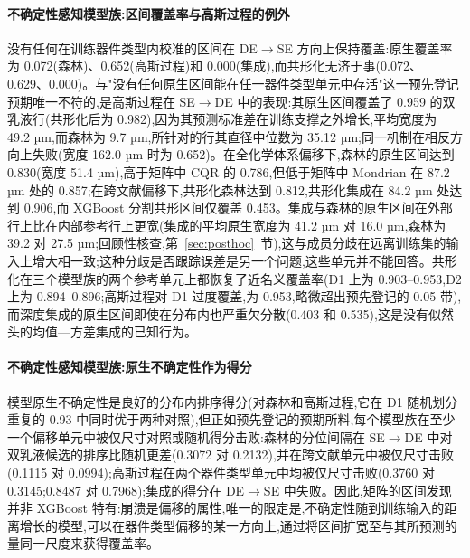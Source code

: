 \documentclass[11pt,a4paper]{ctexart}
\begin{document}
\paragraph{不确定性感知模型族:区间覆盖率与高斯过程的例外} 没有任何在训练器件类型内校准的区间在 DE$\to$SE 方向上保持覆盖:原生覆盖率为 0.072(森林)、0.652(高斯过程)和 0.000(集成),而共形化无济于事(0.072、0.629、0.000)。与"没有任何原生区间能在任一器件类型单元中存活"这一预先登记预期唯一不符的,是高斯过程在 SE$\to$DE 中的表现:其原生区间覆盖了 0.959 的双乳液行(共形化后为 0.982),因为其预测标准差在训练支撑之外增长,平均宽度为 49.2 µm,而森林为 9.7 µm,所针对的行其直径中位数为 35.12 µm;同一机制在相反方向上失败(宽度 162.0 µm 时为 0.652)。在全化学体系偏移下,森林的原生区间达到 0.830(宽度 51.4 µm),高于矩阵中 CQR 的 0.786,但低于矩阵中 Mondrian 在 87.2 µm 处的 0.857;在跨文献偏移下,共形化森林达到 0.812,共形化集成在 84.2 µm 处达到 0.906,而 XGBoost 分割共形区间仅覆盖 0.453。集成与森林的原生区间在外部行上比在内部参考行上更宽(集成的平均原生宽度为 41.2 µm 对 16.0 µm,森林为 39.2 对 27.5 µm;回顾性核查,第~\ref{sec:posthoc}~节),这与成员分歧在远离训练集的输入上增大相一致;这种分歧是否跟踪误差是另一个问题,这些单元并不能回答。共形化在三个模型族的两个参考单元上都恢复了近名义覆盖率(D1 上为 0.903–0.953,D2 上为 0.894–0.896;高斯过程对 D1 过度覆盖,为 0.953,略微超出预先登记的 0.05 带),而深度集成的原生区间即使在分布内也严重欠分散(0.403 和 0.535),这是没有似然头的均值—方差集成的已知行为。

\paragraph{不确定性感知模型族:原生不确定性作为得分} 模型原生不确定性是良好的分布内排序得分(对森林和高斯过程,它在 D1 随机划分重复的 0.93 中同时优于两种对照),但正如预先登记的预期所料,每个模型族在至少一个偏移单元中被仅尺寸对照或随机得分击败:森林的分位间隔在 SE$\to$DE 中对双乳液候选的排序比随机更差(0.3072 对 0.2132),并在跨文献单元中被仅尺寸击败(0.1115 对 0.0994);高斯过程在两个器件类型单元中均被仅尺寸击败(0.3760 对 0.3145;0.8487 对 0.7968);集成的得分在 DE$\to$SE 中失败。因此,矩阵的区间发现并非 XGBoost 特有:崩溃是偏移的属性,唯一的限定是,不确定性随到训练输入的距离增长的模型,可以在器件类型偏移的某一方向上,通过将区间扩宽至与其所预测的量同一尺度来获得覆盖率。
\end{document}
